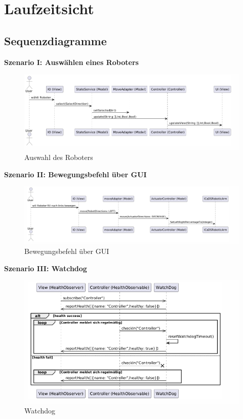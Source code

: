 
\chapter{Laufzeitsicht}

\section{Sequenzdiagramme}
\textbf{Szenario I: Auswählen eines Roboters}\\

\begin{figure}[h]
    \centering
    \includegraphics[width=0.8\linewidth]{diagrams/selectBefehl250625.png}
    \caption{Auswahl des Roboters}
    \label{fig:Auswahl}
\end{figure}

\clearpage\textbf{Szenario II: Bewegungsbefehl über GUI}\\

\begin{figure}[h]  
    \centering
    \includegraphics[width=0.8\linewidth]{diagrams/moveBefehl250625.png}
    \caption{Bewegungsbefehl über GUI}
    \label{fig:Bewegungsbefehl}
\end{figure}

\textbf{Szenario III: Watchdog}\\
\begin{figure}[h]  
    \centering
    \includegraphics[width=0.8\linewidth]{diagrams/watchdog260625.png}
    \caption{Watchdog}
    \label{fig:Watchdog}
\end{figure}


